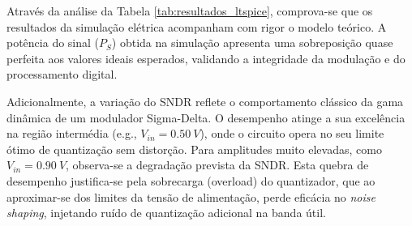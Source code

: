 Através da análise da Tabela \ref{tab:resultados_ltspice}, comprova-se que os resultados da simulação
elétrica acompanham com rigor o modelo teórico. A potência do sinal ($P_S$) obtida na simulação apresenta
uma sobreposição quase perfeita aos valores ideais esperados, validando a integridade da modulação e do
processamento digital.

Adicionalmente, a variação do SNDR reflete o comportamento clássico da gama dinâmica de um modulador
Sigma-Delta. O desempenho atinge a sua excelência na região intermédia (e.g., $V_{in} = 0.50~V$), onde o
circuito opera no seu limite ótimo de quantização sem distorção. Para amplitudes muito elevadas, como
$V_{in} = 0.90~V$, observa-se a degradação prevista da SNDR. Esta quebra de desempenho justifica-se
pela sobrecarga (overload) do quantizador, que ao aproximar-se dos limites da tensão de alimentação,
perde eficácia no \textit{noise shaping}, injetando ruído de quantização adicional na banda útil.

